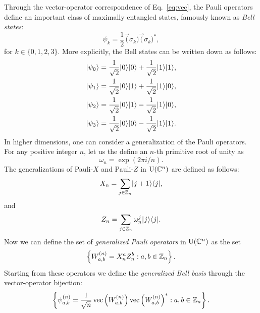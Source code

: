 Through the vector-operator correspondence of Eq.~\ref{eq:vec}, 
the Pauli operators define an important class of maximally
entangled states, famously known as \emph{Bell states}:
\begin{equation}
  \psi_{k} = \frac{1}{2}\vec(\sigma_{k})\vec(\sigma_{k})^{\ast},
\end{equation}
for $k \in \{0,1,2,3\}$. More explicitly, the Bell states can be written down as follows:
\begin{equation} 
\label{eq:Bell-states}
  \begin{aligned}
    \lvert\mspace{0.5mu} \psi_0 \mspace{0.5mu} \rangle & = \frac{1}{\sqrt{2}}\lvert\mspace{0.5mu} 0 \mspace{0.5mu} \rangle\lvert\mspace{0.5mu} 0 \mspace{0.5mu} \rangle 
    + \frac{1}{\sqrt{2}}\lvert\mspace{0.5mu} 1 \mspace{0.5mu} \rangle\lvert\mspace{0.5mu} 1 \mspace{0.5mu} \rangle,\\
    \lvert\mspace{0.5mu} \psi_1 \mspace{0.5mu} \rangle & = \frac{1}{\sqrt{2}}\lvert\mspace{0.5mu} 0 \mspace{0.5mu} \rangle\lvert\mspace{0.5mu} 1 \mspace{0.5mu} \rangle 
    + \frac{1}{\sqrt{2}}\lvert\mspace{0.5mu} 1 \mspace{0.5mu} \rangle\lvert\mspace{0.5mu} 0 \mspace{0.5mu} \rangle,\\
    \lvert\mspace{0.5mu} \psi_2 \mspace{0.5mu} \rangle & = \frac{1}{\sqrt{2}}\lvert\mspace{0.5mu} 0 \mspace{0.5mu} \rangle\lvert\mspace{0.5mu} 1 \mspace{0.5mu} \rangle 
    - \frac{1}{\sqrt{2}}\lvert\mspace{0.5mu} 1 \mspace{0.5mu} \rangle\lvert\mspace{0.5mu} 0 \mspace{0.5mu} \rangle,\\
    \lvert\mspace{0.5mu} \psi_3 \mspace{0.5mu} \rangle & = \frac{1}{\sqrt{2}}\lvert\mspace{0.5mu} 0 \mspace{0.5mu} \rangle\lvert\mspace{0.5mu} 0 \mspace{0.5mu} \rangle 
    - \frac{1}{\sqrt{2}}\lvert\mspace{0.5mu} 1 \mspace{0.5mu} \rangle\lvert\mspace{0.5mu} 1 \mspace{0.5mu} \rangle.
  \end{aligned}
\end{equation}
In higher dimensions, one can consider a generalization of the Pauli operators.
For any positive integer $n$, let us the define an $n$-th primitive root of unity as 
\begin{equation}
  \omega_{n} = \exp(2\pi i/n).
\end{equation}
The generalizations of Pauli-$X$ and Pauli-$Z$ in $\mathrm{U}(\mathbb{C}^{n})$ 
are defined as follows:
\begin{equation}
  X_{n} = \sum_{j \in \mathbb{Z}_{n}}\lvert\mspace{0.5mu} j+1 \mspace{0.5mu} \rangle\langle\mspace{0.5mu} j \mspace{0.5mu} \rvert,
\end{equation}
and
\begin{equation}
  Z_{n} = \sum_{j \in \mathbb{Z}_{n}}\omega_{n}^{j}\lvert\mspace{0.5mu} j \mspace{0.5mu} \rangle\langle\mspace{0.5mu} j \mspace{0.5mu} \rvert.
\end{equation}
Now we can define the set of \emph{generalized Pauli operators} in $\mathrm{U}(\mathbb{C}^{n})$ as the set
\begin{equation}
\label{eq:generalized-Pauli-operators}
  \left\{ W_{a,b}^{(n)} = X_{n}^{a}Z_{n}^{b} : a,b\in\mathbb{Z}_{n}\right\}.
\end{equation}
Starting from these operators we define the \emph{generalized Bell basis}
through the vector-operator bijection:
\begin{equation}
\label{eq:generalized-bell-basis}
  \left\{ \psi_{a,b}^{(n)} = \frac{1}{\sqrt{n}}\operatorname{vec}\left(W_{a,b}^{(n)}\right)
    \operatorname{vec}\left(W_{a,b}^{(n)}\right)^{\ast} : a,b\in\mathbb{Z}_{n} \right\}.
\end{equation}

